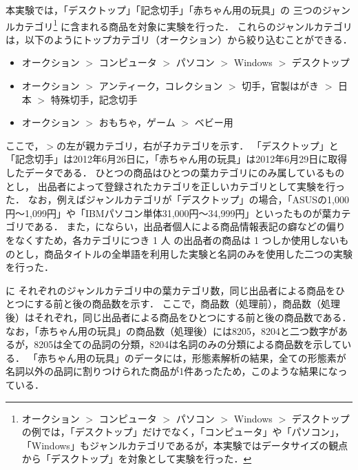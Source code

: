 \documentclass[japanese]{jnlp_1.4}
\newcommand{\tabref}[1]{}
\begin{document}
本実験では，「デスクトップ」「記念切手」「赤ちゃん用の玩具」の
三つのジャンルカテゴリ\footnote{オークション $>$ コンピュータ $>$ パソコン $>$ Windows $>$ デスクトップの例では，「デスクトップ」だけでなく，「コンピュータ」や「パソコン」，「Windows」もジャンルカテゴリであるが，本実験ではデータサイズの観点から「デスクトップ」を対象として実験を行った．}
に含まれる商品を対象に実験を行った．
これらのジャンルカテゴリは，以下のようにトップカテゴリ（オークション）から絞り込むことができる．
\begin{itemize}
 \item オークション $>$ コンピュータ $>$ パソコン $>$ Windows $>$ デスクトップ
 \item オークション $>$ アンティーク，コレクション $>$ 切手，官製はがき $>$ 日本 $>$ 特殊切手，記念切手
 \item オークション $>$ おもちゃ，ゲーム $>$ ベビー用
\end{itemize}
ここで，$>$の左が親カテゴリ，右が子カテゴリを示す．
「デスクトップ」と「記念切手」は2012年6月26日に，「赤ちゃん用の玩具」は2012年6月29日に取得したデータである．
ひとつの商品はひとつの葉カテゴリにのみ属しているものとし，
出品者によって登録されたカテゴリを正しいカテゴリとして実験を行った．
なお，例えばジャンルカテゴリが「デスクトップ」の場合，「ASUSの1,000円〜1,099円」や「IBMパソコン単体31,000円〜34,999円」といったものが葉カテゴリである．
また，にならい，出品者個人による商品情報表記の癖などの偏りをなくすため，各カテゴリにつき 1 人
の出品者の商品は 1 つしか使用しないものとし，商品タイトルの全単語を利用した実験と名詞のみを使用した二つの実験を行った．

\begin{table}[b]
\label{Tab:同じ出品者による商品をひとつにする前と後の商品数}

\end{table}

\tabref{Tab:同じ出品者による商品をひとつにする前と後の商品数}に
それぞれのジャンルカテゴリ中の葉カテゴリ数，同じ出品者による商品をひとつにする前と後の商品数を示す．
ここで，商品数（処理前），商品数（処理後）はそれぞれ，同じ出品者による商品をひとつにする前と後の商品数である．
なお，「赤ちゃん用の玩具」の商品数（処理後）には8205，8204と二つ数字があるが，8205は全ての品詞の分類，8204は名詞のみの分類による商品数を示している．
「赤ちゃん用の玩具」のデータには，形態素解析の結果，全ての形態素が名詞以外の品詞に割りつけられた商品が1件あったため，このような結果になっている．
\end{document}
